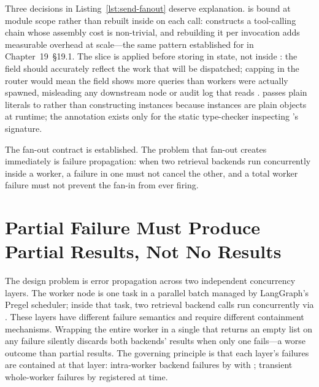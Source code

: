 Three decisions in Listing~\ref{lst:send-fanout} deserve explanation.
 is bound at module scope rather than rebuilt
inside  on each call: 
constructs a tool-calling chain whose assembly cost is non-trivial, and
rebuilding it per invocation adds measurable overhead at scale---the same
pattern established for  in Chapter~19~\S19.1.
The  slice is applied before storing
in state, not inside : the 
field should accurately reflect the work that will be dispatched; capping
in the router would mean the field shows more queries than workers were
actually spawned, misleading any downstream node or audit log that reads
.  passes plain 
literals to  rather than constructing 
instances because  instances are plain  objects
at runtime; the  annotation exists only for the
static type-checker inspecting 's signature.

The fan-out contract is established. The problem that fan-out creates
immediately is failure propagation: when two retrieval backends run
concurrently inside a worker, a failure in one must not cancel the other,
and a total worker failure must not prevent the fan-in from ever firing.


\section{Partial Failure Must Produce Partial Results, Not No Results}
\label{sec:partial-failure}

The design problem is error propagation across two independent concurrency
layers. The worker node is one task in a parallel batch managed by
LangGraph's Pregel scheduler; inside that task, two retrieval backend
calls run concurrently via . These layers have
different failure semantics and require different containment mechanisms.
Wrapping the entire worker in a single  that returns an
empty list on any failure silently discards both backends' results when
only one fails---a worse outcome than partial results. The governing
principle is that each layer's failures are contained at that layer:
intra-worker backend failures by  with
; transient whole-worker failures by
 registered at  time.

